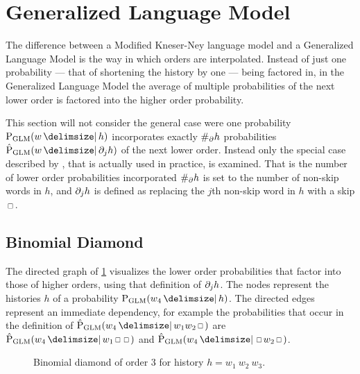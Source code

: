 \section{Generalized Language Model}

The difference between a Modified Kneser-Ney language model and a
Generalized Language Model is the way in which orders are interpolated.
Instead of just one probability --- that of shortening the history by one ---
being factored in, in the Generalized Language Model the average of multiple
probabilities of the next lower order is factored into the higher order
probability.

This section will not consider the general case were one probability
$\ProbGLM{w}{h}$ incorporates exactly $\NumSkpOp{h}$ probabilities
$\ProbGLM*{w}{\SkpOp[j]{h}}$ of the next lower order.
Instead only the special case described by \textcite{Pickhardt2014}, that is
actually used in practice, is examined.
That is the number of lower order probabilities incorporated $\NumSkpOp{h}$
is set to the number of non-skip words in $h$, and $\SkpOp[j]{h}$ is defined as
replacing the $j$th non-skip word in $h$ with a skip $\Skp$.

\subsection{Binomial Diamond}


The directed graph of \cref{fig:history-glm} visualizes the lower order
probabilities that factor into those of higher orders, using that definition of
$\SkpOp[j]{h}$.
The nodes represent the histories $h$ of a probability $\ProbGLM{w_4}{h}$.
The directed edges represent an immediate dependency, for example the
probabilities that occur in the definition of
$\ProbGLM*{w_4}{w_1 w_2 \Skp}$ are $\ProbGLM*{w_4}{w_1 \Skp \Skp}$ and
$\ProbGLM*{w_4}{\Skp w_2 \Skp}$.

\begin{figure}
  \centering
  
  \caption{
    Binomial diamond of order 3 for history $h = w_1 \: w_2 \: w_3$.
  }
  \label{fig:history-glm}
\end{figure}

